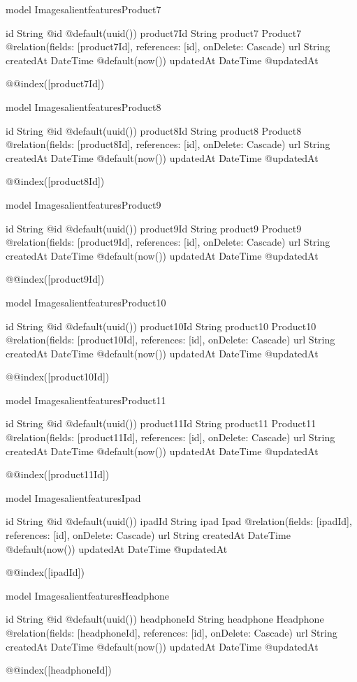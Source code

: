 model ImagesalientfeaturesProduct7 {
  id         String   @id @default(uuid())
  product7Id String
  product7   Product7 @relation(fields: [product7Id], references: [id], onDelete: Cascade)
  url        String
  createdAt  DateTime @default(now())
  updatedAt  DateTime @updatedAt

  @@index([product7Id])
}

model ImagesalientfeaturesProduct8 {
  id         String   @id @default(uuid())
  product8Id String
  product8   Product8 @relation(fields: [product8Id], references: [id], onDelete: Cascade)
  url        String
  createdAt  DateTime @default(now())
  updatedAt  DateTime @updatedAt

  @@index([product8Id])
}

model ImagesalientfeaturesProduct9 {
  id         String   @id @default(uuid())
  product9Id String
  product9   Product9 @relation(fields: [product9Id], references: [id], onDelete: Cascade)
  url        String
  createdAt  DateTime @default(now())
  updatedAt  DateTime @updatedAt

  @@index([product9Id])
}

model ImagesalientfeaturesProduct10 {
  id         String   @id @default(uuid())
  product10Id String
  product10   Product10 @relation(fields: [product10Id], references: [id], onDelete: Cascade)
  url        String
  createdAt  DateTime @default(now())
  updatedAt  DateTime @updatedAt

  @@index([product10Id])
}

model ImagesalientfeaturesProduct11 {
  id         String   @id @default(uuid())
  product11Id String
  product11   Product11 @relation(fields: [product11Id], references: [id], onDelete: Cascade)
  url        String
  createdAt  DateTime @default(now())
  updatedAt  DateTime @updatedAt

  @@index([product11Id])
}

model ImagesalientfeaturesIpad {
  id        String   @id @default(uuid())
  ipadId    String
  ipad      Ipad     @relation(fields: [ipadId], references: [id], onDelete: Cascade)
  url       String
  createdAt DateTime @default(now())
  updatedAt DateTime @updatedAt

  @@index([ipadId])
}

model ImagesalientfeaturesHeadphone {
  id          String    @id @default(uuid())
  headphoneId String
  headphone   Headphone @relation(fields: [headphoneId], references: [id], onDelete: Cascade)
  url         String
  createdAt   DateTime  @default(now())
  updatedAt   DateTime  @updatedAt

  @@index([headphoneId])
}

